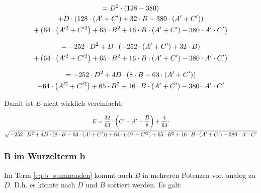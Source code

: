 \documentclass[12pt,a4paper]{article}
\begin{document}
\begin{itemize}
\begin{gather}
\label{eq:b_zahlen}
 =
 D ^2 \cdot \left(128-380\right) \\
 + D \cdot \left(
 128\cdot \left( A' + C' \right) + 32 \cdot B - 380 \cdot \left( A' + C'\right) 
  \right) \notag \\ \notag
 + \left( 
 64\cdot \left(A'^2 + C'^2\right) +65\cdot B^2 +
 16\cdot B\cdot \left(A' + C'\right) - 380 \cdot A' \cdot C' 
 \right) 
\end{gather}

\begin{gather}
\label{eq:b_summanden} 
= -252\cdot D ^2 + D \cdot \left(
 -252\cdot \left( A' + C' \right) + 32 \cdot B 
  \right) \\ \notag
 + \left( 
 64\cdot \left(A'^2 + C'^2\right) +65\cdot B^2 +
 16\cdot B\cdot \left(A' + C'\right) - 380 \cdot A' \cdot C' 
 \right) 
\end{gather}

\begin{gather}
 = -252\cdot D ^2 + 4D \cdot \left(8 \cdot B 
 -63\cdot \left( A' + C' \right) 
  \right)  \label{eq:b_nachD}\\ \notag
 + 
 64\cdot \left(A'^2 + C'^2\right) +65\cdot B^2 +
 16\cdot B\cdot \left(A' + C'\right) - 380 \cdot A' \cdot C' 
\end{gather}



\end{itemize}
  
Damit ist $E$ nicht wirklich vereinfacht: 

\begin{gather}
\label{eq:e_nachACStrich}
 E = 
\frac{32}{63}\cdot \left( C' - A' 
- \frac{B}{8}\right)  \pm \frac{4}{63} \cdot
\\ \notag \sqrt{
-252\cdot D ^2 + 4D \cdot \left(8 \cdot B 
 -63\cdot \left( A' + C' \right) 
  \right) 
 + 
 64\cdot \left(A'^2 + C'^2\right) +65\cdot B^2 +
 16\cdot B\cdot \left(A' + C'\right) - 380 \cdot A' \cdot C' 
} 
\end{gather}



\subsubsection*{B im Wurzelterm b}

Im Term \eqref{eq:b_summanden} kommt auch $B$ in mehreren Potenzen vor, analog zu $D$. D.h. es könnte nach $D$ und $B$ sortiert werden. Es galt:
\end{document}
